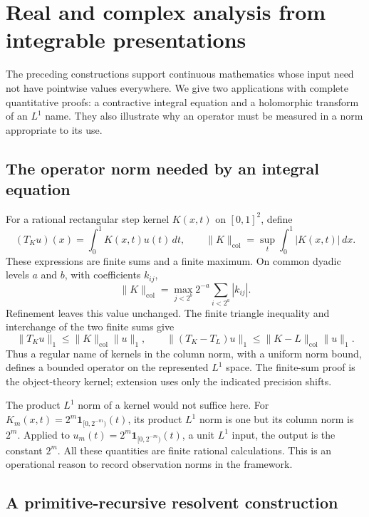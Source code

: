 \section{Real and complex analysis from integrable presentations}
\label{sec:analytic-apps}

The preceding constructions support continuous mathematics whose input
need not have pointwise values everywhere. We give two applications with
complete quantitative proofs: a contractive integral equation and a
holomorphic transform of an \(L^1\) name. They also illustrate why an
operator must be measured in a norm appropriate to its use.

\subsection{The operator norm needed by an integral equation}

For a rational rectangular step kernel \(K(x,t)\) on \([0,1]^2\), define
\[
 (T_Ku)(x)=\int_0^1 K(x,t)u(t)\,dt,\qquad
 \|K\|_{\mathrm{col}}=\sup_t\int_0^1 |K(x,t)|\,dx.
\]
These expressions are finite sums and a finite maximum. On common
dyadic levels \(a\) and \(b\), with coefficients \(k_{ij}\),
\[
 \|K\|_{\mathrm{col}}=
    \max_{j<2^b}2^{-a}\sum_{i<2^a}|k_{ij}|.
\]
Refinement leaves this value unchanged. The finite triangle inequality
and interchange of the two finite sums give
\begin{equation}
 \|T_Ku\|_1\leq\|K\|_{\mathrm{col}}\|u\|_1,
 \qquad
 \|(T_K-T_L)u\|_1\leq\|K-L\|_{\mathrm{col}}\|u\|_1.
 \label{eq:colbound}
\end{equation}
Thus a regular name of kernels in the column norm, with a uniform norm
bound, defines a bounded operator on the represented \(L^1\) space.
The finite-sum proof is the object-theory kernel; extension uses only
the indicated precision shifts.

The product \(L^1\) norm of a kernel would not suffice here. For
\(K_m(x,t)=2^m\mathbf1_{[0,2^{-m})}(t)\), its product \(L^1\) norm is
one but its column norm is \(2^m\). Applied to
\(u_m(t)=2^m\mathbf1_{[0,2^{-m})}(t)\), a unit \(L^1\) input, the
output is the constant \(2^m\). All these quantities are finite rational
calculations. This is an operational reason to record observation norms
in the framework.

\subsection{A primitive-recursive resolvent construction}

